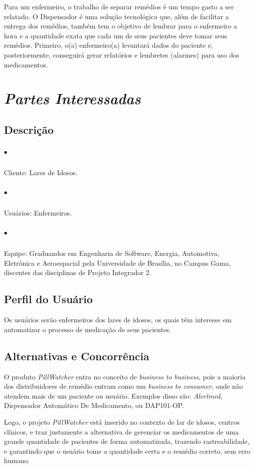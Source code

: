 \begin{apendicesenv}
Para um enfermeiro, o trabalho de separar remédios é um tempo gasto a ser relatado. O Dispensador é uma solução tecnológica que, além de facilitar a entrega dos remédios, também tem o objetivo de lembrar para o enfermeiro a hora e a quantidade exata que cada um de seus pacientes deve tomar seus remédios. Primeiro, o(a) enfermeiro(a) levantará dados do paciente e, posteriormente, conseguirá gerar relatórios e lembretes (alarmes) para uso dos medicamentos.

\section{\textit{Partes Interessadas}}
\subsection*{Descrição}
\subparagraph*{$\bullet$} Cliente: Lares de Idosos.
\subparagraph*{$\bullet$} Usuários: Enfermeiros.
\subparagraph*{$\bullet$} Equipe: Graduandos em Engenharia de Software, Energia, Automotiva, Eletrônica e Aeroespacial pela Universidade de Brasília, no Campus Gama, discentes das disciplinas de Projeto Integrador 2.

\subsection*{Perfil do Usuário}

Os usuários serão enfermeiros dos lares de idosos, os quais têm interesse em automatizar o processo de medicação de seus pacientes.

\subsection*{Alternativas e Concorrência}

O produto \textit{PillWatcher} entra no conceito de \textit{business to business}, pois a maioria dos distribuidores de remédio entram como um \textit{business to consumer}, onde não atendem mais de um paciente ou usuário. Exemplos disso são: \textit{Alertmed}, Dispensador Automático De Medicamento, ou DAP101-OP.

Logo, o projeto \textit{PillWatcher} está inserido no contexto de lar de idosos, centros clínicos, e traz justamente a alternativa de gerenciar os medicamentos de uma grande quantidade de pacientes de forma automatizada, trazendo rastreabilidade, e garantindo que o usuário tome a quantidade certa e o remédio correto, sem erro humano.


\end{apendicesenv}
